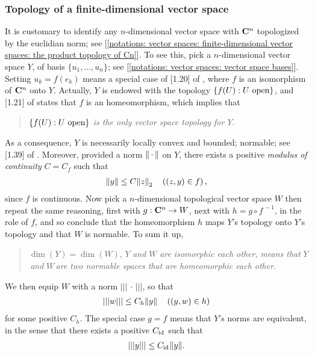 \subsubsection{Topology of a finite-dimensional vector space}
It is customary to identify any $n$-dimensional vector space %
with $\C^n$ topologized by the euclidian norm; %
see [\ref{notations: vector spaces: finite-dimensional vector spaces: the product topology of Cn}]. %
%
To see this, pick a $n$-dimensional vector space $Y$, of basis $\{u_1, \dots, u_n\}$; %
see [\ref{notations: vector spaces: vector space bases}]. %
%
Setting $u_k = f(e_k)$ means a special case of [1.20] of \cite{FA}, %
where $f$ is an isomorphism of $\C^n$ onto $Y$. %
%
Actually, $Y$ is endowed with the topology $\set{f(U)}{U \text{ open}}$, %
%
and [1.21] of \cite{FA} states that $f$ is an homeomorphism, which implies that %
%
\begin{quote}
  $\set{f(U)}{U \text{ open}}$ {\it is the only vector space topology for $Y$}. %
\end{quote}
%
As a consequence, $Y$ is necessarily locally convex and bounded; \ie normable; %
see [1.39] of \cite{FA}. %
Moreover, provided a norm $\norm{\,\cdot\,}$ on $Y$, there exists a positive {\it modulus of continuity} $C=C_f$ such that %
%
\begin{align}\label{norm equivalence 1}
  \norm{y} \leq C \norma{2}{z} \quad \left((z, y) \in f\right), 
\end{align}
%
since $f$ is continuous. %
%
Now pick a $n$-dimensional topological vector space $W$ then repeat the same reasoning, %
first with $g: \C^n \to W$, %
next with $h = g\circ f^{\,\minus 1}$, in the role of $f$, and so conclude that %
the homeomorphism $h$ maps $Y$'s topology onto $Y$'s topology %
and that $W$ is normable. %
To sum it up, %
%
\begin{quote}
  $\dim(Y) = \dim(W)$, \ie %
  $Y$ {\it and } $W$ {\it are isomorphic each other, }
  {\it means that }$Y${\it \,and }$W${\it \,are two normable spaces that are homeomorphic each other.}
\end{quote}
%
We then equip $W$ with a norm $\lvert\lvert\lvert\,\cdot\,\rvert\rvert\rvert$, %
so that %
%
\begin{align}
  \lvert\lvert\lvert w \rvert\rvert\rvert \leq C_h \norm{y} \quad \left((y, w) \in h \right)
\end{align}
%
for some positive $C_h$. %
%
The special case $g=f$ means that $Y$'s norms are equivalent, %
in the sense that there exists a positive $C_{\id{}}$ such that %
\begin{align}
  \lvert\lvert\lvert y \rvert\rvert\rvert \leq C_{\id{}} \norm{y}. %
\end{align}
%

